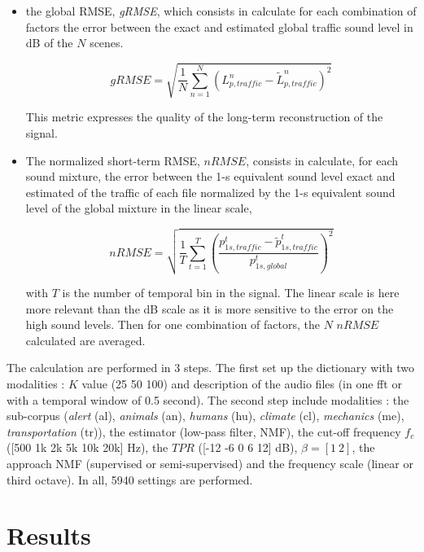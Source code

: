 \documentclass[twocolumn,a4paper,10pt]{article}
\begin{document}
\begin{itemize}
\item the global RMSE, \textit{gRMSE}, which consists in calculate for each combination of factors the error between the exact and estimated global traffic sound level in dB of the $N$ scenes.

\begin{equation}
gRMSE = \sqrt{\frac{1}{N}\sum_{n = 1}^N \left(L^n_{p,traffic}-\tilde{L}^n_{p,traffic}\right)^2}
\end{equation}

This metric expresses the quality of the long-term reconstruction of the signal. 
\item The normalized short-term RMSE, $nRMSE$, consists in calculate, for each sound mixture, the error between the 1-s equivalent sound level exact and estimated of the traffic of each file normalized by the 1-s equivalent sound level of the global mixture in the linear scale, 

\begin{equation}
nRMSE = \sqrt{\frac{1}{T}\sum_{t = 1}^T \left(\frac{p^t_{1s,traffic}-\tilde{p}^t_{1s,traffic}}{p^t_{1s,global}}\right)^2}
\end{equation}

with $T$ is the number of temporal bin in the signal. The linear scale is here more relevant than the dB scale as it is more sensitive to the error on the high sound levels. Then for one combination of factors, the $N$ $nRMSE$ calculated are averaged.\\
\end{itemize}
The calculation are performed in 3 steps. The first set up the dictionary with two modalities : $K$ value (25 50 100) and description of the audio files (in one fft or with a temporal window of 0.5 second). The second step include  modalities : the sub-corpus (\textit{alert} (al), \textit{animals} (an), \textit{humans} (hu), \textit{climate} (cl), \textit{mechanics} (me), \textit{transportation} (tr)), the estimator (low-pass filter, NMF), the cut-off frequency $f_c$ ([500 1k 2k 5k 10k 20k] Hz), the $TPR$ ([-12 -6 0 6 12] dB), $\beta = [1~2]$, the approach NMF  (supervised or semi-supervised) and the frequency scale (linear or third octave). In all, 5940 settings are performed.

\section{Results}\label{part:results}
\end{document}

